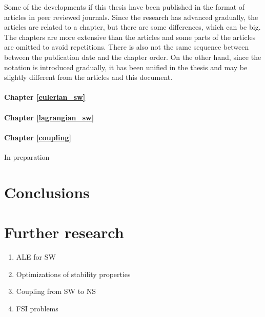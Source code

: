 Some of the developments if this thesis have been published in the format of articles in peer reviewed journals. Since the research has advanced gradually, the articles are related to a chapter, but there are some differences, which can be big.
The chapters are more extensive than the articles and some parts of the articles are omitted to avoid repetitions.
There is also not the same sequence between between the publication date and the chapter order.
On the other hand, since the notation is introduced gradually, it has been unified in the thesis and may be slightly different from the articles and this document.

\paragraph{Chapter \ref{eulerian_sw}} 
\paragraph{Chapter \ref{lagrangian_sw}} 
\paragraph{Chapter \ref{coupling}} In preparation




\section{Conclusions}





\section{Further research}


\begin{enumerate}
    \item ALE for SW
    \item Optimizations of stability properties
    \item Coupling from SW to NS
    \item FSI problems
\end{enumerate}

